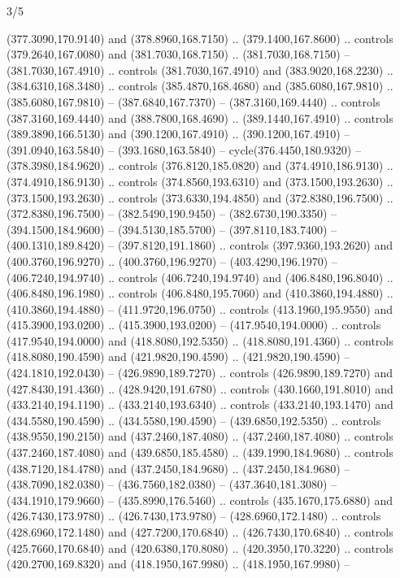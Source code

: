 \begin{flagdescription}{3/5}
\begin{scope}[shift={(0.5\flaglength,0.5\flagwidth)},scale=\flagwidth/510]
\begin{scope}[y=0.80pt, x=0.80pt, yscale=-1.06, xscale=1.06,yshift=-240pt,xshift=-400pt]
\begin{scope}[cm={{0.83333,0.0,0.0,0.83333,(154.64672,48.64761)}}]
\begin{scope}[cm={{0.93334,0.0,0.0,0.93334,(-4.86471,22.64035)}}]
\begin{scope}[line width=0.489\lw]
\begin{scope}[draw=c003300,fill=c338a00]
  (377.3090,170.9140) and (378.8960,168.7150) .. (379.1400,167.8600) .. controls
  (379.2640,167.0080) and (381.7030,168.7150) .. (381.7030,168.7150) --
  (381.7030,167.4910) .. controls (381.7030,167.4910) and (383.9020,168.2230) ..
  (384.6310,168.3480) .. controls (385.4870,168.4680) and (385.6080,167.9810) ..
  (385.6080,167.9810) -- (387.6840,167.7370) -- (387.3160,169.4440) .. controls
  (387.3160,169.4440) and (388.7800,168.4690) .. (389.1440,167.4910) .. controls
  (389.3890,166.5130) and (390.1200,167.4910) .. (390.1200,167.4910) --
  (391.0940,163.5840) -- (393.1680,163.5840) -- cycle(376.4450,180.9320) --
  (378.3980,184.9620) .. controls (376.8120,185.0820) and (374.4910,186.9130) ..
  (374.4910,186.9130) .. controls (374.8560,193.6310) and (373.1500,193.2630) ..
  (373.1500,193.2630) .. controls (373.6330,194.4850) and (372.8380,196.7500) ..
  (372.8380,196.7500) -- (382.5490,190.9450) -- (382.6730,190.3350) --
  (394.1500,184.9600) -- (394.5130,185.5700) -- (397.8110,183.7400) --
  (400.1310,189.8420) -- (397.8120,191.1860) .. controls (397.9360,193.2620) and
  (400.3760,196.9270) .. (400.3760,196.9270) -- (403.4290,196.1970) --
  (406.7240,194.9740) .. controls (406.7240,194.9740) and (406.8480,196.8040) ..
  (406.8480,196.1980) .. controls (406.8480,195.7060) and (410.3860,194.4880) ..
  (410.3860,194.4880) -- (411.9720,196.0750) .. controls (413.1960,195.9550) and
  (415.3900,193.0200) .. (415.3900,193.0200) -- (417.9540,194.0000) .. controls
  (417.9540,194.0000) and (418.8080,192.5350) .. (418.8080,191.4360) .. controls
  (418.8080,190.4590) and (421.9820,190.4590) .. (421.9820,190.4590) --
  (424.1810,192.0430) -- (426.9890,189.7270) .. controls (426.9890,189.7270) and
  (427.8430,191.4360) .. (428.9420,191.6780) .. controls (430.1660,191.8010) and
  (433.2140,194.1190) .. (433.2140,193.6340) .. controls (433.2140,193.1470) and
  (434.5580,190.4590) .. (434.5580,190.4590) -- (439.6850,192.5350) .. controls
  (438.9550,190.2150) and (437.2460,187.4080) .. (437.2460,187.4080) .. controls
  (437.2460,187.4080) and (439.6850,185.4580) .. (439.1990,184.9680) .. controls
  (438.7120,184.4780) and (437.2450,184.9680) .. (437.2450,184.9680) --
  (438.7090,182.0380) -- (436.7560,182.0380) -- (437.3640,181.3080) --
  (434.1910,179.9660) -- (435.8990,176.5460) .. controls (435.1670,175.6880) and
  (426.7430,173.9780) .. (426.7430,173.9780) -- (428.6960,172.1480) .. controls
  (428.6960,172.1480) and (427.7200,170.6840) .. (426.7430,170.6840) .. controls
  (425.7660,170.6840) and (420.6380,170.8080) .. (420.3950,170.3220) .. controls
  (420.2700,169.8320) and (418.1950,167.9980) .. (418.1950,167.9980) --

\end{scope}
\end{scope}
\end{scope}
\end{scope}
\end{scope}
\end{scope}
\end{flagdescription}
